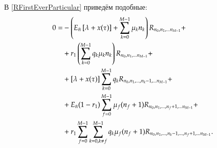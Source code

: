 В \eqref{RFirstEverParticular} приведём подобные:
\begin{equation}\begin{aligned} \label{REquationParticular}
0=
    &-\Q{\En \T{\lxt}+\allExecutionFullIntensity{n}{k}}\seqStandart{R}{n}+\\
    &+r_1 \Q{\allExecutionRelativeIntensity{n}{k}} \seqStandart{R}{n} + \\
    &+\T{\lxt}\sum_{k=0}^{M-1}q_k \seqMinus{R}{n}{k} + \\
    &+\En (1 - r_1) \sum_{f=0}^{M-1} \mu_f (n_f + 1) \seqPlus{R}{n}{f} + \\
    &+r_1 \feedbackSum{f}{k}
        q_k \mu_f (n_f+1) \seqMinusPlus{R}{n}{k}{f}.
\end{aligned}\end{equation}


